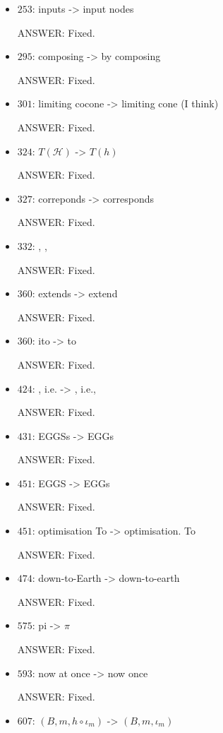 \documentclass[english,11pt,a4paper]{article}
\begin{document}
\begin{itemize}
\item $253$: inputs -> input nodes

ANSWER: Fixed.

\item $295$: composing -> by composing

ANSWER: Fixed.

\item $301$: limiting cocone -> limiting cone (I think)

ANSWER: Fixed.

\item $324$: $T(\mathcal{H})$ -> $T(h)$

ANSWER: Fixed.

\item $327$: correponds -> corresponds

ANSWER: Fixed.

\item $332$: , ,

ANSWER: Fixed.

\item $360$: extends -> extend

ANSWER: Fixed.

\item $360$: ito -> to

ANSWER: Fixed.

\item $424$: , i.e. -> , i.e.,

ANSWER: Fixed.

\item $431$: EGGSs -> EGGs

ANSWER: Fixed.

\item $451$: EGGS -> EGGs

ANSWER: Fixed.

\item $451$: optimisation To -> optimisation. To

ANSWER: Fixed.

\item $474$: down-to-Earth -> down-to-earth

ANSWER: Fixed.

\item $575$: pi -> $\pi$

ANSWER: Fixed.

\item $593$: now at once -> now once

ANSWER: Fixed.

\item $607$: $(B,{m, h \circ \iota_m})$ -> $(B,{m,\iota_m})$


\end{itemize}
\end{document}
